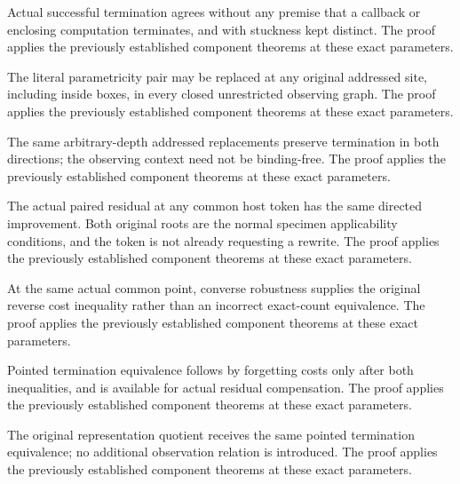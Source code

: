Actual successful termination agrees without any premise that a callback
or enclosing computation terminates, and with stuckness kept distinct.
The proof applies the previously established component theorems at these exact parameters.
\par{}

The literal parametricity pair may be replaced at any original addressed site,
including inside boxes, in every closed unrestricted observing graph.
The proof applies the previously established component theorems at these exact parameters.
\par{}

The same arbitrary-depth addressed replacements preserve termination in
both directions; the observing context need not be binding-free.
The proof applies the previously established component theorems at these exact parameters.
\par{}

The actual paired residual at any common host token has the same directed
improvement. Both original roots are the normal specimen applicability
conditions, and the token is not already requesting a rewrite.
The proof applies the previously established component theorems at these exact parameters.
\par{}

At the same actual common point, converse robustness supplies the original
reverse cost inequality rather than an incorrect exact-count equivalence.
The proof applies the previously established component theorems at these exact parameters.
\par{}

Pointed termination equivalence follows by forgetting costs only after
both inequalities, and is available for actual residual compensation.
The proof applies the previously established component theorems at these exact parameters.
\par{}

The original representation quotient receives the same pointed
termination equivalence; no additional observation relation is introduced.
The proof applies the previously established component theorems at these exact parameters.
\par{}


